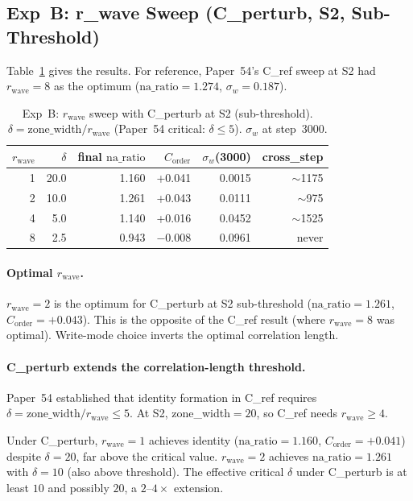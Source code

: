 \documentclass[11pt,a4paper]{article}
\newcommand{\Corder}{C_{\mathrm{order}}}
\newcommand{\sw}{\sigma_w}
\newcommand{\na}{\mathrm{na\_ratio}}
\begin{document}
\subsection{Exp~B: r\_wave Sweep (C\_perturb, S2, Sub-Threshold)}

Table~\ref{tab:expb} gives the results. For reference, Paper~54's C\_ref sweep at
S2 had $r_\mathrm{wave}=8$ as the optimum ($\na=1.274$, $\sw=0.187$).

\begin{table}[h]
\centering
\caption{Exp~B: $r_\mathrm{wave}$ sweep with C\_perturb at S2 (sub-threshold).
$\delta = \text{zone\_width}/r_\mathrm{wave}$ (Paper~54 critical: $\delta \leq 5$).
$\sw$ at step~3000.}
\label{tab:expb}
\begin{tabular}{rrrrrr}
\toprule
$r_\mathrm{wave}$ & $\delta$ & final $\na$ & $\Corder$ & $\sw$(3000) & cross\_step \\
\midrule
 1 & 20.0 & 1.160 & +0.041 & 0.0015 & $\sim$1175 \\
 2 & 10.0 & 1.261 & +0.043 & 0.0111 & $\sim$975  \\
 4 &  5.0 & 1.140 & +0.016 & 0.0452 & $\sim$1525 \\
 8 &  2.5 & 0.943 & $-0.008$ & 0.0961 & never \\
\bottomrule
\end{tabular}
\end{table}

\paragraph{Optimal $r_\mathrm{wave}$.}
$r_\mathrm{wave}=2$ is the optimum for C\_perturb at S2 sub-threshold ($\na=1.261$,
$\Corder=+0.043$). This is the opposite of the C\_ref result (where $r_\mathrm{wave}=8$
was optimal). Write-mode choice inverts the optimal correlation length.

\paragraph{C\_perturb extends the correlation-length threshold.}
Paper~54 established that identity formation in C\_ref requires
$\delta = \text{zone\_width}/r_\mathrm{wave} \leq 5$.
At S2, zone\_width$=20$, so C\_ref needs $r_\mathrm{wave} \geq 4$.

Under C\_perturb, $r_\mathrm{wave}=1$ achieves identity ($\na=1.160$,
$\Corder=+0.041$) despite $\delta=20$, far above the critical value.
$r_\mathrm{wave}=2$ achieves $\na=1.261$ with $\delta=10$ (also above threshold).
The effective critical $\delta$ under C\_perturb is at least $10$ and possibly $20$,
a $2$--$4\times$ extension.
\end{document}
